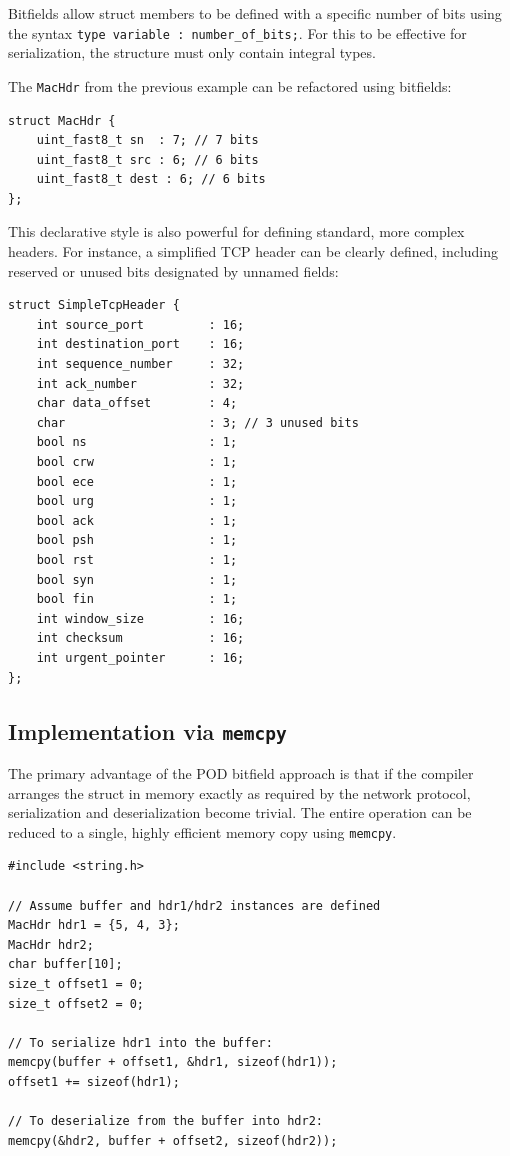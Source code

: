 \documentclass{article}
\begin{document}
Bitfields allow struct members to be defined with a specific number of bits using the syntax \texttt{type variable : number\_of\_bits;}. For this to be effective for serialization, the structure must only contain integral types.

The \texttt{MacHdr} from the previous example can be refactored using bitfields:

\begin{center}
\begin{verbatim}
struct MacHdr {
    uint_fast8_t sn  : 7; // 7 bits
    uint_fast8_t src : 6; // 6 bits
    uint_fast8_t dest : 6; // 6 bits
};
\end{verbatim}
\end{center}

This declarative style is also powerful for defining standard, more complex headers. For instance, a simplified TCP header can be clearly defined, including reserved or unused bits designated by unnamed fields:

\begin{center}
\begin{verbatim}
struct SimpleTcpHeader {
    int source_port         : 16;
    int destination_port    : 16;
    int sequence_number     : 32;
    int ack_number          : 32;
    char data_offset        : 4;
    char                    : 3; // 3 unused bits
    bool ns                 : 1;
    bool crw                : 1;
    bool ece                : 1;
    bool urg                : 1;
    bool ack                : 1;
    bool psh                : 1;
    bool rst                : 1;
    bool syn                : 1;
    bool fin                : 1;
    int window_size         : 16;
    int checksum            : 16;
    int urgent_pointer      : 16;
};
\end{verbatim}
\end{center}

\subsection{Implementation via \texttt{memcpy}}

The primary advantage of the POD bitfield approach is that if the compiler arranges the struct in memory exactly as required by the network protocol, serialization and deserialization become trivial. The entire operation can be reduced to a single, highly efficient memory copy using \texttt{memcpy}.

\begin{center}
\begin{verbatim}
#include <string.h>

// Assume buffer and hdr1/hdr2 instances are defined
MacHdr hdr1 = {5, 4, 3};
MacHdr hdr2;
char buffer[10];
size_t offset1 = 0;
size_t offset2 = 0;

// To serialize hdr1 into the buffer:
memcpy(buffer + offset1, &hdr1, sizeof(hdr1));
offset1 += sizeof(hdr1);

// To deserialize from the buffer into hdr2:
memcpy(&hdr2, buffer + offset2, sizeof(hdr2));
\end{verbatim}
\end{center}
\end{document}
